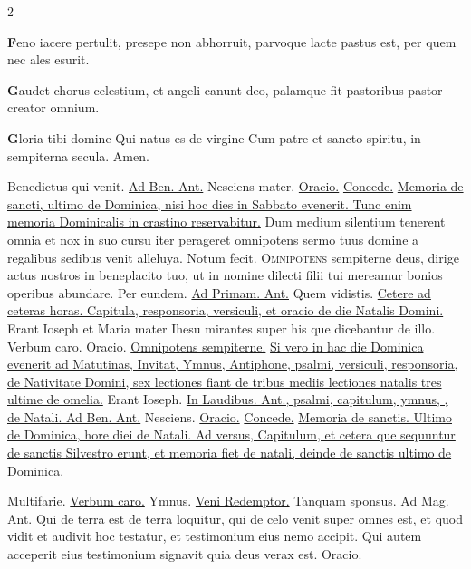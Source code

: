 \begin{multicols*}{2}
{\par {\bfseries \color{Red} F}eno iacere pertulit,
presepe non abhorruit,
parvoque lacte pastus est,
per quem nec ales esurit.
\par {\bfseries \color{Blue} G}audet chorus celestium,
et angeli canunt deo,
palamque fit pastoribus
pastor creator omnium.
\par {\bfseries \color{Red} G}loria tibi domine
Qui natus es de virgine
Cum patre et sancto spiritu,
in sempiterna secula. Amen.
}
\newline \V Benedictus qui venit.
\newline \ul{Ad Ben. Ant.} Nesciens mater. \ul{Oracio.} \hyperlink{concede-nativitas}{Concede.} \ul{Memoria de sancti, ultimo de Dominica, nisi hoc dies in Sabbato evenerit. Tunc enim memoria Dominicalis in crastino reservabitur.}
 Dum medium silentium tenerent omnia et nox in suo cursu iter perageret omnipotens sermo tuus domine a regalibus sedibus venit alleluya. \V Notum fecit.
\lettrine[lines=2]{\zallmancaps \color{Red} O}{mnipotens} \hypertarget{omnipotens-nativitas}{sempiterne} deus, dirige actus nostros in beneplacito tuo, ut in nomine dilecti filii tui mereamur bonios operibus abundare. Per eundem.
\newline \ul{Ad Primam. Ant.} Quem vidistis. \ul{Cetere ad ceteras horas. Capitula, responsoria, versiculi, et oracio de die Natalis Domini.}
 Erant Ioseph et Maria mater Ihesu mirantes super his que dicebantur de illo. \V Verbum caro. Oracio. \hyperlink{omnipotens-nativitas}{Omnipotens sempiterne.}
\newline \ul{Si vero in hac die Dominica evenerit ad Matutinas, Invitat, Ymnus, Antiphone, psalmi, versiculi, responsoria, de Nativitate Domini, sex lectiones fiant de tribus mediis lectiones natalis tres ultime de omelia.} Erant Ioseph. \ul{In Laudibus. Ant., psalmi, capitulum, ymnus, \Vbar , de Natali. Ad Ben. Ant.} Nesciens. \ul{Oracio.} \hyperlink{concede-nativitas}{Concede.} \ul{Memoria de sanctis. Ultimo de Dominica, hore diei de Natali. Ad versus, Capitulum, et cetera que sequuntur de sanctis Silvestro erunt, et memoria fiet de natali, deinde de sanctis ultimo de Dominica.}
{\color{Red} }
\par {} Multifarie. \R \hyperlink{verbum-caro-factum-doxology}{Verbum caro.} {\color{Red} Ymnus.} \hyperlink{veni-redemptor}{Veni Redemptor.} \V Tanquam sponsus. {\color{Red} Ad Mag. Ant.} Qui de terra est de terra loquitur, qui de celo venit super omnes est, et quod vidit et audivit hoc testatur, et testimonium eius nemo accipit. Qui autem acceperit eius testimonium signavit quia deus verax est. {\color{Red} Oracio.}

\end{multicols*}
